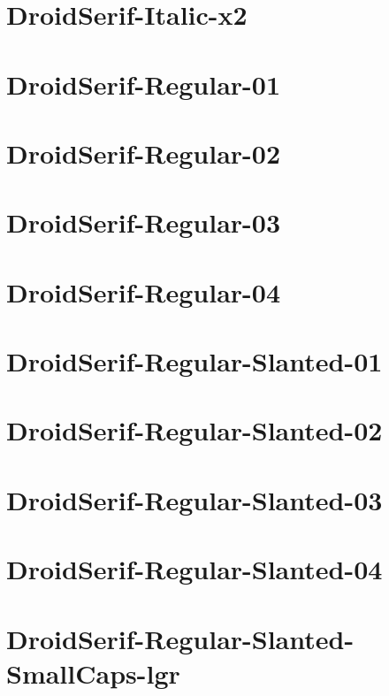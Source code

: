 \documentclass{article}
\begin{document}
\section{DroidSerif-Italic-x2}

\section{DroidSerif-Regular-01}

\section{DroidSerif-Regular-02}

\section{DroidSerif-Regular-03}

\section{DroidSerif-Regular-04}

\section{DroidSerif-Regular-Slanted-01}

\section{DroidSerif-Regular-Slanted-02}

\section{DroidSerif-Regular-Slanted-03}

\section{DroidSerif-Regular-Slanted-04}

\section{DroidSerif-Regular-Slanted-SmallCaps-lgr}
\end{document}

